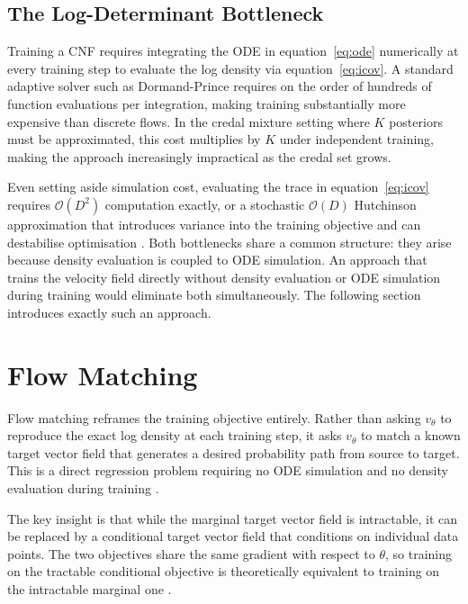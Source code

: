     \subsection{The Log-Determinant Bottleneck}

    Training a CNF requires integrating the ODE in equation~\eqref{eq:ode} numerically at every training step to evaluate the log density via equation~\eqref{eq:icov}. A standard adaptive solver such as Dormand-Prince \citep{dormand1980} requires on the order of hundreds of function evaluations per integration, making training substantially more expensive than discrete flows. In the credal mixture setting where $K$ posteriors must be approximated, this cost multiplies by $K$ under independent training, making the approach increasingly impractical as the credal set grows.

    Even setting aside simulation cost, evaluating the trace in equation~\eqref{eq:icov} requires $\mathcal{O}(D^2)$ computation exactly, or a stochastic $\mathcal{O}(D)$ Hutchinson approximation that introduces variance into the training objective and can destabilise optimisation \citep{grathwohl2019}. Both bottlenecks share a common structure: they arise because density evaluation is coupled to ODE simulation. An approach that trains the velocity field directly without density evaluation or ODE simulation during training would eliminate both simultaneously. The following section introduces exactly such an approach.

\section{Flow Matching}
    Flow matching reframes the training objective entirely. Rather than asking $v_\theta$ to reproduce the exact log density at each training step, it asks $v_\theta$ to match a known target vector field that generates a desired probability path from source to target. This is a direct regression problem requiring no ODE simulation and no density evaluation during training \citep{lipman2022, albergo2022}.

    The key insight is that while the marginal target vector field is intractable, it can be replaced by a conditional target vector field that conditions on individual data points. The two objectives share the same gradient with respect to $\theta$, so training on the tractable conditional objective is theoretically equivalent to training on the intractable marginal one \citep{lipman2022}.

